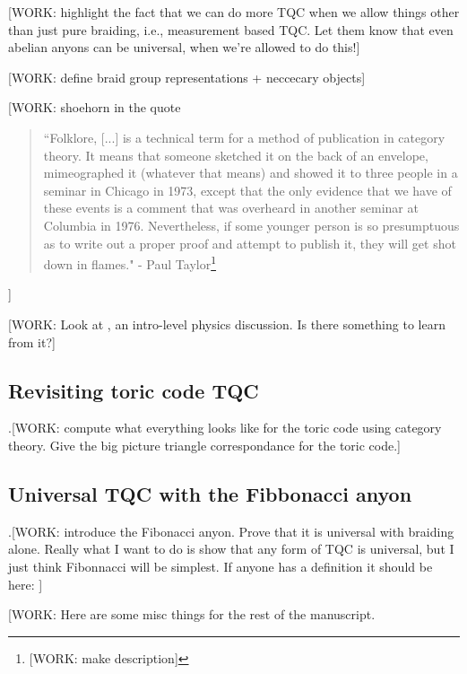 \documentclass{article}
\theoremstyle{definition}
\numberwithin{figure}{section}
\begin{document}
[WORK: highlight the fact that we can do more TQC when we allow things other than just pure braiding, i.e., measurement based TQC. Let them know that even abelian anyons can be universal, when we're allowed to do this!]

[WORK: define braid group representations + neccecary objects]

[WORK: shoehorn in the quote

\begin{quote}
``Folklore, [...] is a technical term for a method of publication in category theory. It means that someone sketched it on the back of an envelope, mimeographed it (whatever that means) and showed it to three people in a seminar in Chicago in 1973, except that the only evidence that we have of these events is a comment that was overheard in another seminar at Columbia in 1976. Nevertheless, if some younger person is so presumptuous as to write out a proper proof and attempt to publish it, they will get shot down in flames." - Paul Taylor\footnote{[WORK: make description]\cite{aubert2019categories}}
\end{quote}

]

[WORK: Look at \cite{lahtinen2017short}, an intro-level physics discussion. Is there something to learn from it?]

\subsection{Revisiting toric code TQC}
\label{Revisiting toric code TQC}

.[WORK: compute what everything looks like for the toric code using category theory. Give the big picture triangle correspondance for the toric code.]


\subsection{Universal TQC with the Fibbonacci anyon}
\label{Universal TQC with the Fibbonacci anyon}

.[WORK: introduce the Fibonacci anyon. Prove that it is universal with braiding alone. Really what I want to do is show that any form of TQC is universal, but I just think Fibonnacci will be simplest. If anyone has a definition it should be here: \cite{trebst2008short}]




[WORK: Here are some misc things for the rest of the manuscript.
\end{document}
